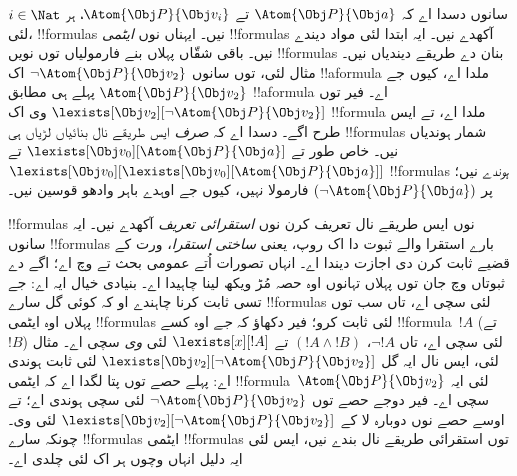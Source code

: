 \documentclass[../../../include/open-logic-section]{subfiles}
\begin{document}
 سانوں دسدا اے کہ
$\Atom{\Obj P}{\Obj a}$ تے
$\Atom{\Obj P}{\Obj v_i}$، ہر $i \in
\Nat$ لئی، !!{formula}s نیں۔ ایہناں نوں
\emph{ایٹمی} !!{formula}s آکھدے نیں۔
ایہ ابتدا لئی مواد دیندے نیں۔ باقی شقّاں
پہلاں بنے فارمولیاں توں نویں !!{formula}s
بنان دے طریقے دیندیاں نیں۔ مثال لئی،
 توں سانوں
$\lnot \Atom{\Obj P}{\Obj v_2}$ اک
!!a{formula} ملدا اے، کیوں جے
$\Atom{\Obj P}{\Obj v_2}$ پہلے ہی
 مطابق !!a{formula}
اے۔ فیر  توں
$\lexists[\Obj v_2][\lnot \Atom{\Obj P}{\Obj v_2}]$
وی اک !!{formula} ملدا اے، تے ایس
طرح اگے۔  دسدا
اے کہ \emph{صرف} ایس طریقے نال
بنائیاں لڑیاں ہی !!{formula}s شمار
ہوندیاں نیں۔ خاص طور تے
$\lexists[\Obj v_0][\Atom{\Obj P}{\Obj a}]$
تے $\lexists[\Obj
  v_0][\lexists[\Obj v_0][\Atom{\Obj P}{\Obj a}]]$
!!{formula}s \emph{ہوندے} نیں؛ پر
$(\lnot \Atom{\Obj P}{\Obj a})$
فارمولا نہیں، کیوں جے اوہدے
باہر وادھو قوسین نیں۔

!!{formula}s نوں ایس طریقے نال تعریف کرن
نوں \emph{استقرائی تعریف} آکھدے نیں۔
ایہ سانوں !!{formula}s بارے استقرا
والے ثبوت دا اک روپ، یعنی
\emph{ساختی استقرا}، ورت کے قضیے
ثابت کرن دی اجازت دیندا اے۔
انہاں تصورات اُتے عمومی بحث
 تے
 وچ اے؛
اگے دے ثبوتاں وچ جان توں پہلاں
تہانوں اوہ حصہ مُڑ ویکھ لینا چاہیدا اے۔
بنیادی خیال ایہ اے: جے تسی ثابت کرنا
چاہندے او کہ کوئی گل سارے !!{formula}s
لئی سچی اے، تاں سب توں پہلاں اوہ
ایٹمی !!{formula}s لئی ثابت کرو؛
فیر دکھاؤ کہ \emph{جے} اوہ کسے
!!{formula}~$!A$ (تے~$!B$) لئی سچی
اے، تاں $\lnot !A$، $(!A \land !B)$
تے $\lexists[x][!A]$ لئی \emph{وی}
سچی اے۔ مثال لئی، ایس نال ایہ گل
$\lexists[\Obj v_2][\lnot \Atom{\Obj P}{\Obj v_2}]$
لئی ثابت ہوندی اے: پہلے حصے توں
پتا لگدا اے کہ ایٹمی !!{formula}~$\Atom{\Obj
P}{\Obj v_2}$ لئی ایہ سچی اے۔
فیر دوجے حصے توں
$\lnot \Atom{\Obj P}{\Obj v_2}$
لئی سچی ہوندی اے؛ تے اوسے حصے نوں
دوبارہ لا کے
$\lexists[\Obj v_2][\lnot \Atom{\Obj P}{\Obj v_2}]$
لئی وی۔ چونکہ سارے !!{formula}s
ایٹمی !!{formula}s توں استقرائی
طریقے نال بندے نیں، ایس لئی
ایہ دلیل انہاں وچوں ہر اک لئی
چلدی اے۔
\end{document}
